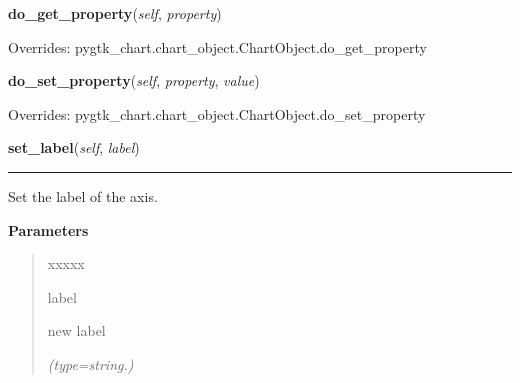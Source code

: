     \vspace{0.5ex}

\hspace{.8\funcindent}\begin{boxedminipage}{\funcwidth}

    \raggedright \textbf{do\_get\_property}(\textit{self}, \textit{property})

\setlength{\parskip}{2ex}
\setlength{\parskip}{1ex}
      Overrides: pygtk\_chart.chart\_object.ChartObject.do\_get\_property

    \end{boxedminipage}

    \vspace{0.5ex}

\hspace{.8\funcindent}\begin{boxedminipage}{\funcwidth}

    \raggedright \textbf{do\_set\_property}(\textit{self}, \textit{property}, \textit{value})

\setlength{\parskip}{2ex}
\setlength{\parskip}{1ex}
      Overrides: pygtk\_chart.chart\_object.ChartObject.do\_set\_property

    \end{boxedminipage}

    \label{pygtk_chart:line_chart:Axis:set_label}

    \vspace{0.5ex}

\hspace{.8\funcindent}\begin{boxedminipage}{\funcwidth}

    \raggedright \textbf{set\_label}(\textit{self}, \textit{label})

    \vspace{-1.5ex}

    \rule{\textwidth}{0.5\fboxrule}
\setlength{\parskip}{2ex}
    Set the label of the axis.

\setlength{\parskip}{1ex}
      \textbf{Parameters}
      \vspace{-1ex}

      \begin{quote}
        \begin{Ventry}{xxxxx}

          \item[label]

          new label

            {\it (type=string.)}

        \end{Ventry}

      \end{quote}

    \end{boxedminipage}

